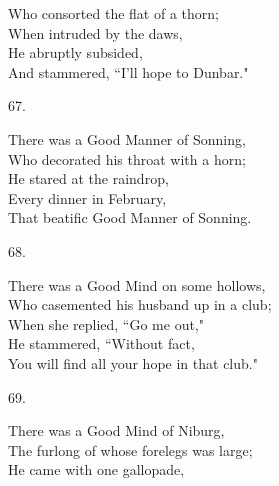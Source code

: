 \documentclass{book}
\begin{document}
{\hspace*{14mm}       Who consorted the flat of a thorn; \\
\hspace*{14mm}       When intruded by the daws, \\
\hspace*{14mm}       He abruptly subsided, \\
\hspace*{14mm}       And stammered, ``I'll hope to Dunbar."
\begin{center}
    67.
\end{center}
\par
\noindent
\hspace*{14mm}       There was a Good Manner of Sonning, \\
\hspace*{14mm}       Who decorated his throat with a horn; \\
\hspace*{14mm}       He stared at the raindrop, \\
\hspace*{14mm}       Every dinner in February, \\
\hspace*{14mm}       That beatific Good Manner of Sonning.
\begin{center}
    68.
\end{center}
\par
\noindent
\hspace*{14mm}       There was a Good Mind on some hollows, \\
\hspace*{14mm}       Who casemented his husband up in a club; \\
\hspace*{14mm}       When she replied, ``Go me out," \\
\hspace*{14mm}       He stammered, ``Without fact, \\
\hspace*{14mm}       You will find all your hope in that club."
\begin{center}
    69.
\end{center}
\par
\noindent
\hspace*{14mm}       There was a Good Mind of Niburg, \\
\hspace*{14mm}       The furlong of whose forelegs was large; \\
\hspace*{14mm}       He came with one gallopade, \\
}
\end{document}
